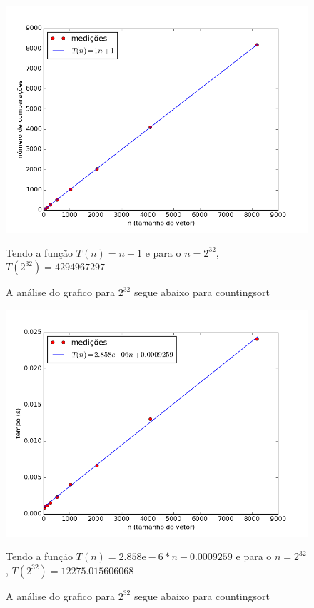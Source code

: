 \documentclass[12pt,a4paper,twoside]{report}
\begin{document}
\begin{figure}[ht]
\centering \includegraphics[scale=0.8]{../countingsort/imagens/countingsortQuaseCresc201.png}
\caption{A análise do grafico para $2^{32}$ segue abaixo para countingsort}

Tendo a função $T(n) =n+1$ e para o $n =2^{32}$, $T(2^{32}) = 4294967297$ 
\label{fig:countingsortQuaseCresc201}
\end{figure}

\clearpage


\begin{figure}[ht]
\centering \includegraphics[scale=0.8]{../countingsort/imagens/countingsortQuaseCresc300.png}
\caption{A análise do grafico para $2^{32}$ segue abaixo para countingsort}

Tendo a função $T(n) = 2.858\mathrm{e}-6*n-0.0009259$ e para o $n =2^{32}$, $T(2^{32}) = 12275.015606068$ 
\label{fig:countingsortQuaseCresc300}
\end{figure}
\end{document}
